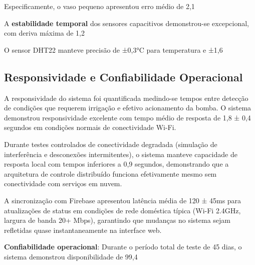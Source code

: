 Especificamente, o vaso pequeno apresentou erro médio de 2,1%

A \textbf{estabilidade temporal} dos sensores capacitivos demonstrou-se excepcional, com deriva máxima de 1,2%

O sensor DHT22 manteve precisão de ±0,3°C para temperatura e ±1,6%

\subsection{Responsividade e Confiabilidade Operacional}

A responsividade do sistema foi quantificada medindo-se tempos entre detecção de condições que requerem irrigação e efetivo acionamento da bomba. O sistema demonstrou responsividade excelente com tempo médio de resposta de 1,8 ± 0,4 segundos em condições normais de conectividade Wi-Fi.

Durante testes controlados de conectividade degradada (simulação de interferência e desconexões intermitentes), o sistema manteve capacidade de resposta local com tempos inferiores a 0,9 segundos, demonstrando que a arquitetura de controle distribuído funciona efetivamente mesmo sem conectividade com serviços em nuvem.

A sincronização com Firebase apresentou latência média de 120 ± 45ms para atualizações de status em condições de rede doméstica típica (Wi-Fi 2.4GHz, largura de banda 20+ Mbps), garantindo que mudanças no sistema sejam refletidas quase instantaneamente na interface web.

\textbf{Confiabilidade operacional}: Durante o período total de teste de 45 dias, o sistema demonstrou disponibilidade de 99,4%

